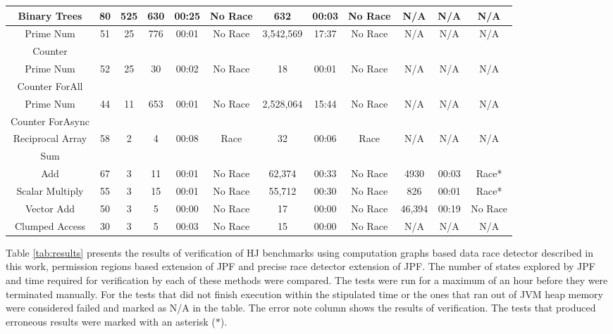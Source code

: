 \begin{landscape}
\begin{table*}
\begin{tabular}{|c|c|c|c|c|c|c|c|c|c|c|c|}
Binary Trees & 80 & 525 
& 630 & 00:25 & No Race
& 632 & 00:03 & No Race 
& N/A & N/A & N/A \\ \hline

Prime Num & 51 & 25
& 776 & 00:01 & No Race
& 3,542,569 & 17:37 & No Race 
& N/A & N/A & N/A \\ 
Counter &  & 
& & &
& & &
& & & \\ \hline

Prime Num  & 52 & 25
& 30 & 00:02 & No Race
& 18 & 00:01 & No Race
& N/A & N/A & N/A \\
Counter ForAll &  & 
& & &
& & &
& & & \\ \hline

Prime Num & 44 & 11 
& 653 & 00:01 & No Race
& 2,528,064 & 15:44 & No Race 
& N/A & N/A & N/A \\
Counter ForAsync &  & 
& & &
& & &
& & & \\ \hline
Reciprocal Array & 58 & 2
& 4 & 00:08 & Race
& 32 & 00:06 & Race
& N/A & N/A & N/A \\ 
Sum &  & 
& & &
& & &
& & & \\ \hline

Add  & 67 & 3 
& 11 & 00:01 & No Race 
& 62,374 & 00:33 & No Race
& 4930 & 00:03 & Race* \\ \hline

Scalar Multiply  & 55 & 3 
& 15 & 00:01 & No Race
& 55,712 & 00:30 & No Race 
& 826 & 00:01 & Race* \\ \hline

Vector Add  & 50 & 3 
& 5 & 00:00 & No Race
& 17 & 00:00 & No Race 
& 46,394 & 00:19 & No Race \\ \hline

Clumped Access  & 30 & 3 
& 5 & 00:03 & No Race
& 15 & 00:00 & No Race 
& N/A & N/A & N/A \\ \hline

\end{tabular}
\end{table*}
\end{landscape}

Table \ref{tab:results} presents the results of verification of HJ benchmarks using computation graphs based data race detector described in this work, permission regions based extension of JPF and precise race detector extension of JPF. The number of states explored by JPF and time required for verification by each of these methods were compared. The tests were run for a maximum of an hour before they were terminated manually. For the tests that did not finish execution within the stipulated time or the ones that ran out of JVM heap memory were considered failed and marked as N/A in the table. The error note column shows the results of verification. The tests that produced erroneous results were marked with an asterisk ($\ast$). 


